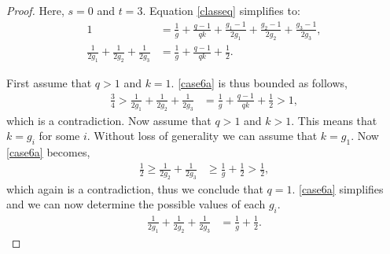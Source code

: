\documentclass[a4paper , 11pt]{book}
\theoremstyle{definition}
\theoremstyle{remark}
\begin{document}
\begin{proof} Here, $s = 0$ and $t = 3$. Equation \eqref{classeq} simplifies to:
\begin{align} \label{case6a} 1 &= \frac{1}{g} + \frac{q-1}{qk} + \frac{g_1 -1}{2g_1} + \frac{g_2 -1}{2g_2} + \frac{g_3 -1}{2g_3}, \nonumber
\\[1ex] \frac{1}{2g_1} + \frac{1}{2g_2} + \frac{1}{2g_3} &= \frac{1}{g} + \frac{q-1}{qk} + \frac{1}{2}.
\end{align}

First assume that $q > 1$ and $k=1$. \eqref{case6a} is thus bounded as follows,
\begin{align*} \frac{3}{4} > \frac{1}{2g_1} + \frac{1}{2g_2} + \frac{1}{2g_3} &= \frac{1}{g} + \frac{q-1}{qk} + \frac{1}{2} > 1,
\end{align*}
which is a contradiction. Now assume that $q > 1$ and $k > 1$. This means that $k=g_i$ for some $i$. Without loss of generality we can assume that $k=g_1$. Now \eqref{case6a} becomes,
\begin{align*} \frac{1}{2} \geq \frac{1}{2g_2} + \frac{1}{2g_3} &\geq \frac{1}{g} + \frac{1}{2} > \frac{1}{2},
\end{align*}
which again is a contradiction, thus we conclude that $q=1$. \eqref{case6a} simplifies and we can now determine the possible values of each $g_i$.
 \begin{align} \label{case6b} \frac{1}{2g_1} + \frac{1}{2g_2} + \frac{1}{2g_3} &= \frac{1}{g} + \frac{1}{2}.
\end{align}


\end{proof}
\end{document}
